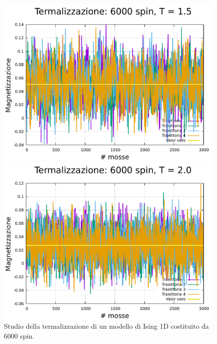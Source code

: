 \begin{figure}[htbp]
    \begin{minipage}{0.45\textwidth}  
      \centering
      \includegraphics[page=1, width=\textwidth]{Immagini/simIsing1D/term/term_6000_1.5.pdf}
      \caption{$T\,=\,1.5$}
    \end{minipage}\hfill
    \begin{minipage}{0.45\textwidth}  
      \centering
      \includegraphics[page=1, width=\textwidth]{Immagini/simIsing1D/term/term_6000_2.0.pdf}
      \caption{$T\,=\,2.0$}
    \end{minipage}
    \caption{Studio della termalizzazione di un modello di Ising 1D costituito da 6000 spin.}
\end{figure}

